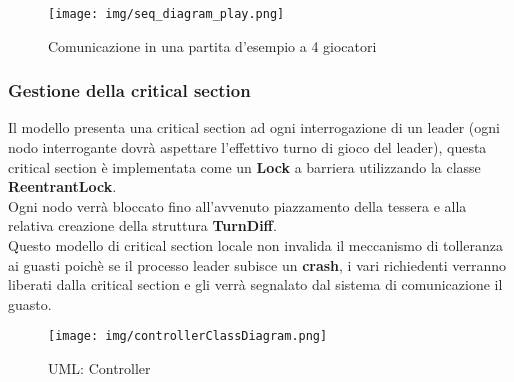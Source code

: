 \begin{figure}[H]
	\centering
	\texttt{[image: img/seq\_diagram\_play.png]}
	\caption{Comunicazione in una partita d'esempio a 4 giocatori}
	\label{img:sequence}
\end{figure}

\subsubsection{Gestione della critical section}
	Il modello presenta una critical section ad ogni interrogazione di un leader
	(ogni nodo interrogante dovr\`a aspettare l'effettivo turno
	di gioco del leader), questa critical section \`e implementata come un
	\textbf{Lock} a barriera utilizzando la classe \textbf{ReentrantLock}.\\
	Ogni nodo verr\`a bloccato fino all'avvenuto piazzamento della tessera e
	alla relativa creazione della struttura \textbf{TurnDiff}.\\
	Questo modello di critical section locale non invalida il meccanismo di
	tolleranza ai guasti poich\`e se il processo leader subisce un
	\textbf{crash}, i vari richiedenti verranno liberati dalla critical
	section e gli verr\`a segnalato dal sistema di comunicazione il guasto.

\begin{figure}[H]
	\centering
	\texttt{[image: img/controllerClassDiagram.png]}
	\caption{UML: Controller}
	\label{img:controller}
\end{figure}

